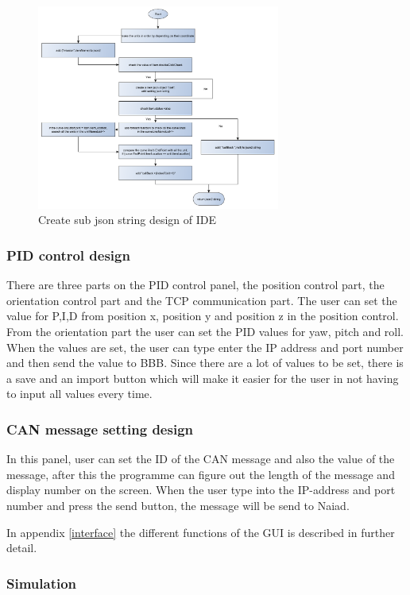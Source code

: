 \begin{figure}[!ht]
	\begin{center}
		\includegraphics[width=80mm]{./Images/Software/Generate_SubJson_string.png}
		\caption{Create sub json string design of IDE}
		\label{Generate_SubJson_string}
	\end{center}
\end{figure}

\subsubsection*{PID control design}
\noindent
There are three parts on the PID control panel, the position control part, the orientation control part and the TCP communication part. The user can set the value for P,I,D from position x, position y and position z in the position control. From the orientation part the user can set the PID values for yaw, pitch and roll. When the values are set, the user can type enter the IP address and port number and then send the value to BBB. Since there are a lot of values to be set, there is a save and an import button which will make it easier for the user in not having to input all values every time. 
\subsubsection*{CAN message setting design}
\noindent
In this panel, user can set the ID of the CAN message and also the value of the message, after this the programme can figure out the length of the message and display number on the screen. When the user type into the IP-address and port number and press the send button, the message will be send to Naiad.

In appendix \ref{interface} the different functions of the GUI is described in further detail. 
	\subsubsection{Simulation} %
